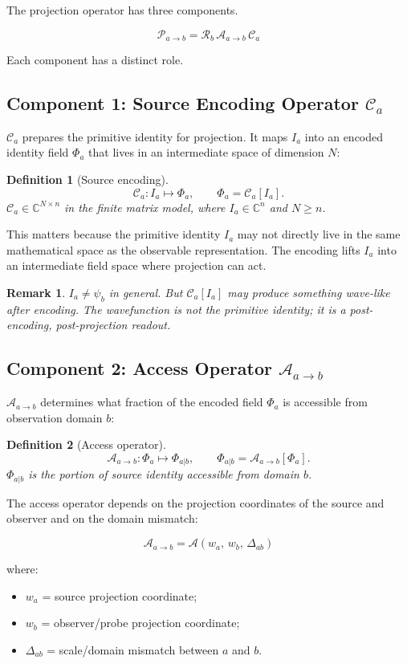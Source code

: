\documentclass[11pt,a4paper,oneside]{article}
\newtheorem{definition}{Definition}[section]
\newtheorem{remark}{Remark}[section]
\newcommand{\Ia}{I_a}
\newcommand{\Pab}{\mathcal{P}_{a\to b}}
\newcommand{\Ca}{\mathcal{C}_a}
\newcommand{\Aab}{\mathcal{A}_{a\to b}}
\newcommand{\Rb}{\mathcal{R}_b}
\newcommand{\PhiA}{\Phi_a}              %
\newcommand{\PhiAb}{\Phi_{a|b}}         %
\newcommand{\wa}{w_a}
\newcommand{\wb}{w_b}
\newcommand{\Dab}{\Delta_{ab}}
\newcommand{\psiab}{\psi_b}
\begin{document}
The projection operator has three components.

\[
\boxed{\Pab = \Rb\,\Aab\,\Ca}
\]

Each component has a distinct role.

\subsection{Component 1: Source Encoding Operator $\Ca$}

$\Ca$ prepares the primitive identity for projection. It maps $\Ia$ into an encoded identity field $\PhiA$ that lives in an intermediate space of dimension $N$:

\begin{definition}[Source encoding]
\[
\Ca : \Ia \mapsto \PhiA,\qquad \PhiA = \Ca[\Ia].
\]
$\Ca \in \mathbb{C}^{N \times n}$ in the finite matrix model, where $\Ia \in \mathbb{C}^n$ and $N \geq n$.
\end{definition}

This matters because the primitive identity $\Ia$ may not directly live in the same mathematical space as the observable representation. The encoding lifts $\Ia$ into an intermediate field space where projection can act.

\begin{remark}
$\Ia \neq \psiab$ in general. But $\Ca[\Ia]$ may produce something wave-like after encoding. The wavefunction is not the primitive identity; it is a post-encoding, post-projection readout.
\end{remark}

\subsection{Component 2: Access Operator $\Aab$}

$\Aab$ determines what fraction of the encoded field $\PhiA$ is accessible from observation domain $b$:

\begin{definition}[Access operator]
\[
\Aab : \PhiA \mapsto \PhiAb,\qquad \PhiAb = \Aab[\PhiA].
\]
$\PhiAb$ is the portion of source identity accessible from domain $b$.
\end{definition}

The access operator depends on the projection coordinates of the source and observer and on the domain mismatch:

\[
\boxed{\Aab = \mathcal{A}(\wa,\, \wb,\, \Dab)}
\]

where:
\begin{itemize}
\item $\wa$ = source projection coordinate;
\item $\wb$ = observer/probe projection coordinate;
\item $\Dab$ = scale/domain mismatch between $a$ and $b$.
\end{itemize}
\end{document}
